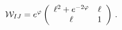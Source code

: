 \begin{equation}
{\cal W}_{IJ} = e^{\varphi} \left( \begin{array}{cc}
\ell^2 + e^{-2 \varphi} & \ell  \\
\ell    &  1          \\
\end{array}
\right)\, .
\label{Wscalar}
\end{equation}

